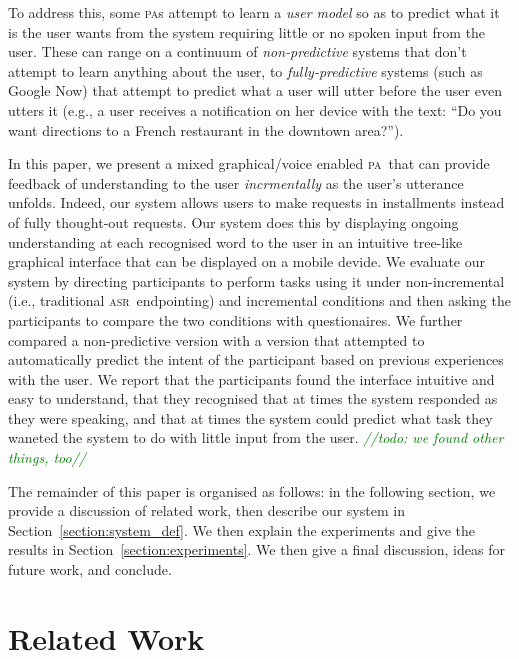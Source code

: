 \documentclass[11pt]{article}
\newcommand{\todo}[1]{\textcolor{green}{\emph{//todo: #1//}}}
\newcommand{\asr}[0]{\textsc{asr}}
\newcommand{\pa}[0]{\textsc{pa}}
\begin{document}
To address this, some \pa s attempt to learn a \emph{user model} so as to predict what it is the user wants from the system requiring little or no spoken input from the user. These can range on a continuum of \emph{non-predictive} systems that don't attempt to learn anything about the user, to \emph{fully-predictive} systems (such as Google Now) that attempt to predict what a user will utter before the user even utters it (e.g., a user receives a notification on her device with the text: ``Do you want directions to a French restaurant in the downtown area?''). 

In this paper, we present a mixed graphical/voice enabled \pa\ that can provide feedback of understanding to the user \emph{incrmentally} as the user's utterance unfolds. Indeed, our system allows users to make requests in installments instead of fully thought-out requests. Our system does this by displaying ongoing understanding at each recognised word to the user in an intuitive tree-like graphical interface that can be displayed on a mobile devide. We evaluate our system by directing participants to perform tasks using it under non-incremental (i.e., traditional \asr\ endpointing) and incremental conditions and then asking the participants to compare the two conditions with questionaires. We further compared a non-predictive version with a version that attempted to automatically predict the intent of the participant based on previous experiences with the user. We report that the participants found the interface intuitive and easy to understand, that they recognised that at times the system responded as they were speaking, and that at times the system could predict what task they waneted the system to do with little input from the user. \todo{we found other things, too}

The remainder of this paper is organised as follows: in the following section, we provide a discussion of related work, then describe our system in Section~\ref{section:system_def}. We then explain the experiments and give the results in Section~\ref{section:experiments}. We then give a final discussion, ideas for future work, and conclude. 

\section{Related Work}
\label{section:related_work}
\end{document}
